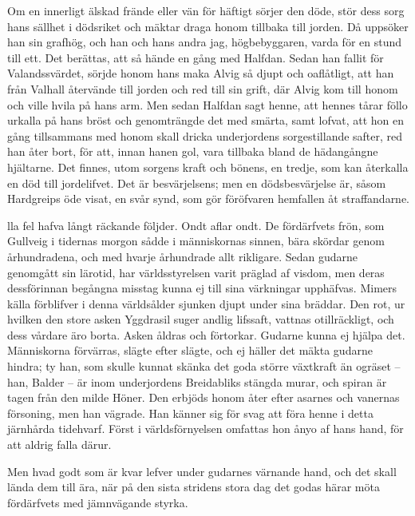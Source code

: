 Om en innerligt älskad frände eller vän för häftigt sörjer den döde,
stör dess sorg hans sällhet i dödsriket och mäktar draga honom tillbaka
till jorden. Då uppsöker han sin grafhög, och han och hans andra jag,
högbebyggaren, varda för en stund till ett. Det berättas, att så hände
en gång med Halfdan. Sedan han fallit för Valandssvärdet, sörjde honom
hans maka Alvig så djupt och oaflåtligt, att han från Valhall återvände
till jorden och red till sin grift, där Alvig kom till honom och ville
hvila på hans arm. Men sedan Halfdan sagt henne, att hennes tårar föllo
urkalla på hans bröst och genomträngde det med smärta, samt lofvat, att
hon en gång tillsammans med honom skall dricka underjordens
sorgestillande safter, red han åter bort, för att, innan hanen gol, vara
tillbaka bland de hädangångne hjältarne. Det finnes, utom sorgens kraft
och bönens, en tredje, som kan återkalla en död till jordelifvet. Det är
besvärjelsens; men en dödsbesvärjelse är, såsom Hardgreips öde visat, en
svår synd, som gör föröfvaren hemfallen åt straffandarne.

\endSecII


\dropcapA lla fel hafva långt räckande följder. Ondt aflar ondt. De fördärfvets
frön, som Gullveig i tidernas morgon sådde i människornas sinnen, bära
skördar genom århundradena, och med hvarje århundrade allt rikligare.
Sedan gudarne genomgått sin lärotid, har världsstyrelsen varit präglad
af visdom, men deras dessförinnan begångna misstag kunna ej till sina
värkningar upphäfvas. Mimers källa förblifver i denna världsålder
sjunken djupt under sina bräddar. Den rot, ur hvilken den store asken
Yggdrasil suger andlig lifssaft, vattnas otillräckligt, och dess vårdare
äro borta. Asken åldras och förtorkar. Gudarne kunna ej hjälpa det.
Människorna förvärras, slägte efter slägte, och ej häller det mäkta
gudarne hindra; ty han, som skulle kunnat skänka det goda större
växtkraft än ogräset -- han, Balder -- är inom underjordens Breidabliks
stängda murar, och spiran är tagen från den milde Höner. Den erbjöds
honom åter efter asarnes och vanernas försoning, men han vägrade. Han
känner sig för svag att föra henne i detta järnhårda tidehvarf. Först i
världsförnyelsen omfattas hon ånyo af hans hand, för att aldrig falla
därur.

Men hvad godt som är kvar lefver under gudarnes värnande hand, och det
skall lända dem till ära, när på den sista stridens stora dag det godas
härar möta fördärfvets med jämnvägande styrka.

